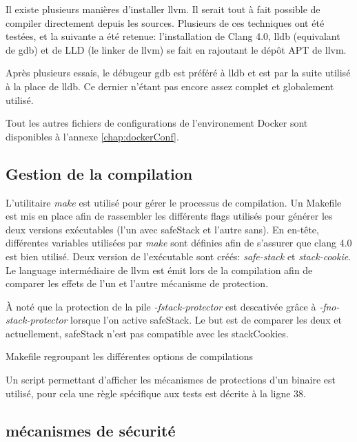 Il existe plusieurs manières d'installer \gls{llvm}. Il serait tout à fait possible de compiler directement depuis les sources. Plusieurs de ces techniques ont été testées, et la suivante a été retenue: l'installation de Clang 4.0, \gls{lldb} (equivalant de \gls{gdb}) et de LLD (le \og linker \fg de \gls{llvm}) se fait en rajoutant le dépôt APT de \gls{llvm}.

Après plusieurs essais, le débugeur \gls{gdb} est préféré à \gls{lldb} et est par la suite utilisé à la place de \gls{lldb}. Ce dernier n'étant pas encore assez complet et globalement utilisé.

Tout les autres fichiers de configurations de l'environement Docker sont disponibles à l'annexe \ref{chap:dockerConf}.

\subsection{Gestion de la compilation}

L'utilitaire \textit{make} est utilisé pour gérer le processus de compilation. Un Makefile est mis en place afin de rassembler les différents \og flags \fg utilisés pour générer les deux versions exécutables (l'un avec \gls{safeStack} et l'autre sans). En en-tête, différentes variables utilisées par \textit{make} sont définies afin de s'assurer que \gls{clang} 4.0 est bien utilisé. Deux version de l'exécutable sont créés: \textit{safe-stack} et \textit{stack-cookie}. Le language intermédiaire de \gls{llvm} est émit lors de la compilation afin de comparer les effets de l'un et l'autre mécanisme de protection.

À noté que la protection de la pile \textit{-fstack-protector} est descativée grâce à \textit{-fno-stack-protector} lorsque l'on active \gls{safeStack}. Le but est de comparer les deux et actuellement, \gls{safeStack} n'est pas compatible avec les \gls{stackCookies}.

\begin{listing}
	\caption{Makefile regroupant les différentes options de compilations}
	\label{lst:defaultMakefile}
\end{listing}

Un script permettant d'afficher les mécanismes de protections d'un binaire est utilisé, pour cela une règle spécifique aux tests est décrite à la ligne 38.

\subsection{mécanismes de sécurité}

